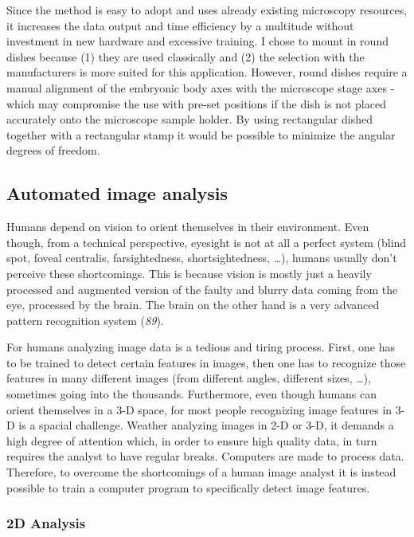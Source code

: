 \documentclass[11pt,singlespacinge,twoside]{reedthesis} %
\theoremstyle{definition}
\theoremstyle{definition}
\theoremstyle{definition}
\theoremstyle{remark}
\begin{document}
Since the method is easy to adopt and uses already existing microscopy resources, it increases the data output and time efficiency by a multitude without investment in new hardware and excessive training. I chose to mount in round dishes because (1) they are used classically and (2) the selection with the manufacturers is more suited for this application. However, round dishes require a manual alignment of the embryonic body axes with the microscope stage axes - which may compromise the use with pre-set positions if the dish is not placed accurately onto the microscope sample holder. By using rectangular dished together with a rectangular stamp it would be possible to minimize the angular degrees of freedom.

\hypertarget{automated-image-analysis}{%
\subsection{Automated image analysis}\label{automated-image-analysis}}

Humans depend on vision to orient themselves in their environment. Even though, from a technical perspective, eyesight is not at all a perfect system (blind spot, foveal centralis, farsightedness, shortsightedness, \ldots), humans usually don't perceive these shortcomings. This is because vision is mostly just a heavily processed and augmented version of the faulty and blurry data coming from the eye, processed by the brain. The brain on the other hand is a very advanced pattern recognition system (\emph{89}).

For humans analyzing image data is a tedious and tiring process. First, one has to be trained to detect certain features in images, then one has to recognize those features in many different images (from different angles, different sizes, \ldots), sometimes going into the thousands. Furthermore, even though humans can orient themselves in a 3-D space, for most people recognizing image features in 3-D is a spacial challenge. Weather analyzing images in 2-D or 3-D, it demands a high degree of attention which, in order to ensure high quality data, in turn requires the analyst to have regular breaks. Computers are made to process data. Therefore, to overcome the shortcomings of a human image analyst it is instead possible to train a computer program to specifically detect image features.

\hypertarget{d-analysis}{%
\subsubsection{2D Analysis}\label{d-analysis}}
\end{document}
